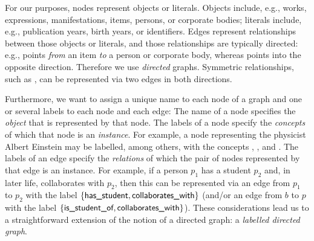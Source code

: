 For our purposes,
nodes represent objects or literals. Objects include, e.g., works, expressions, manifestations, items,
persons, or corporate bodies; literals include, e.g., publication years, birth years, or identifiers.
Edges represent relationships between those objects or literals, and those relationships are typically directed:
e.g.,  points \emph{from} an item
\emph{to} a person or corporate body,
whereas  points into the opposite direction.
Therefore we use \emph{directed} graphs.
Symmetric relationships, such as ,
can be represented via two edges in both directions.

Furthermore, we want to assign a unique name to each node of a graph
and one or several labels to each node and each edge:
The name of a node specifies the \emph{object} that is represented by that node.
The labels of a node specify the \emph{concepts}
of which that node is an \emph{instance}.
For example, a node representing the physicist Albert Einstein
may be labelled, among others, with the concepts , ,
and .
The labels of an edge specify the \emph{relations} of which the pair of nodes
represented by that edge is an instance.
For example, if a person $p_1$ has a student $p_2$ and, in later life, 
collaborates with $p_2$, then this can be represented via an edge from $p_1$ to $p_2$
with the label $\{\textsf{has\_student},\textsf{collaborates\_with}\}$
(and/or an edge from $b$ to $p$ with the label $\{\textsf{is\_student\_of},\textsf{collaborates\_with}\}$).
These considerations lead us to a straightforward extension
of the notion of a directed graph:
a \emph{labelled directed graph}.


